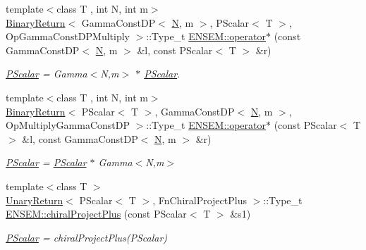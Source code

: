 \begin{DoxyCompactItemize}
{\footnotesize template$<$class T , int N, int m$>$ }\\\mbox{\hyperlink{structBinaryReturn}{Binary\+Return}}$<$ Gamma\+Const\+DP$<$ \mbox{\hyperlink{adat__devel_2lib_2hadron_2operator__name__util_8cc_a7722c8ecbb62d99aee7ce68b1752f337}{N}}, m $>$, P\+Scalar$<$ T $>$, Op\+Gamma\+Const\+D\+P\+Multiply $>$\+::Type\+\_\+t \mbox{\hyperlink{group__primscalar_gab3054a5c0ba0653b3b4069e2449e20ab}{E\+N\+S\+E\+M\+::operator$\ast$}} (const Gamma\+Const\+DP$<$ \mbox{\hyperlink{adat__devel_2lib_2hadron_2operator__name__util_8cc_a7722c8ecbb62d99aee7ce68b1752f337}{N}}, m $>$ \&l, const P\+Scalar$<$ T $>$ \&r)
\begin{DoxyCompactList}\small\item\em \mbox{\hyperlink{classENSEM_1_1PScalar}{P\+Scalar}} = Gamma$<$\+N,m$>$ $\ast$ \mbox{\hyperlink{classENSEM_1_1PScalar}{P\+Scalar}}. \end{DoxyCompactList}\item 
{\footnotesize template$<$class T , int N, int m$>$ }\\\mbox{\hyperlink{structBinaryReturn}{Binary\+Return}}$<$ P\+Scalar$<$ T $>$, Gamma\+Const\+DP$<$ \mbox{\hyperlink{adat__devel_2lib_2hadron_2operator__name__util_8cc_a7722c8ecbb62d99aee7ce68b1752f337}{N}}, m $>$, Op\+Multiply\+Gamma\+Const\+DP $>$\+::Type\+\_\+t \mbox{\hyperlink{group__primscalar_ga97e70139990daa175326a04636431dbd}{E\+N\+S\+E\+M\+::operator$\ast$}} (const P\+Scalar$<$ T $>$ \&l, const Gamma\+Const\+DP$<$ \mbox{\hyperlink{adat__devel_2lib_2hadron_2operator__name__util_8cc_a7722c8ecbb62d99aee7ce68b1752f337}{N}}, m $>$ \&r)
\begin{DoxyCompactList}\small\item\em \mbox{\hyperlink{classENSEM_1_1PScalar}{P\+Scalar}} = \mbox{\hyperlink{classENSEM_1_1PScalar}{P\+Scalar}} $\ast$ Gamma$<$\+N,m$>$ \end{DoxyCompactList}\item 
{\footnotesize template$<$class T $>$ }\\\mbox{\hyperlink{structUnaryReturn}{Unary\+Return}}$<$ P\+Scalar$<$ T $>$, Fn\+Chiral\+Project\+Plus $>$\+::Type\+\_\+t \mbox{\hyperlink{group__primscalar_ga5c2866755d31c5ec528c5763aa16a833}{E\+N\+S\+E\+M\+::chiral\+Project\+Plus}} (const P\+Scalar$<$ T $>$ \&s1)
\begin{DoxyCompactList}\small\item\em \mbox{\hyperlink{classENSEM_1_1PScalar}{P\+Scalar}} = chiral\+Project\+Plus(\+P\+Scalar) \end{DoxyCompactList}\item 

\end{DoxyCompactItemize}
